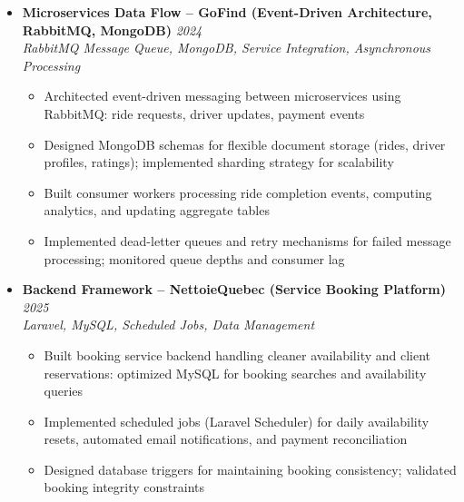 \documentclass[a4paper,11pt]{article}
\begin{document}
\begin{itemize}[leftmargin=*, label={-}]
\item \textbf{Microservices Data Flow -- GoFind (Event-Driven Architecture, RabbitMQ, MongoDB)} \hfill \textit{2024} \\
\textit{RabbitMQ Message Queue, MongoDB, Service Integration, Asynchronous Processing} \vspace{-2pt}
    \begin{itemize}[leftmargin=0.4cm, nosep, label=\tiny$\bullet$]
        \item Architected event-driven messaging between microservices using RabbitMQ: ride requests, driver updates, payment events
        \item Designed MongoDB schemas for flexible document storage (rides, driver profiles, ratings); implemented sharding strategy for scalability
        \item Built consumer workers processing ride completion events, computing analytics, and updating aggregate tables
        \item Implemented dead-letter queues and retry mechanisms for failed message processing; monitored queue depths and consumer lag
    \end{itemize}

\item \textbf{Backend Framework -- NettoieQuebec (Service Booking Platform)} \hfill \textit{2025} \\
\textit{Laravel, MySQL, Scheduled Jobs, Data Management} \vspace{-2pt}
    \begin{itemize}[leftmargin=0.4cm, nosep, label=\tiny$\bullet$]
        \item Built booking service backend handling cleaner availability and client reservations: optimized MySQL for booking searches and availability queries
        \item Implemented scheduled jobs (Laravel Scheduler) for daily availability resets, automated email notifications, and payment reconciliation
        \item Designed database triggers for maintaining booking consistency; validated booking integrity constraints
    \end{itemize}

\end{itemize}

\vspace{4pt}

\end{document}
